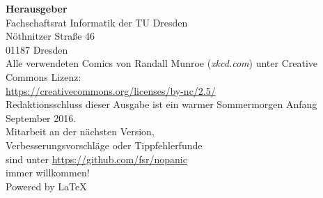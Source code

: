 \newpage
\thispagestyle{empty} %
\color{white}

\begin{minipage}[t][\textheight][b]{.60\textwidth}
\footnotesize
\textbf{Herausgeber} \\
Fachschaftsrat Informatik der TU Dresden\\
Nöthnitzer Straße 46\\
01187 Dresden\\[1\baselineskip]

Alle verwendeten Comics von Randall Munroe (\textit{xkcd.com}) unter Creative Commons Lizenz:\\
\url{https://creativecommons.org/licenses/by-nc/2.5/}\\[1\baselineskip]

Redaktionsschluss dieser Ausgabe ist ein warmer Sommermorgen Anfang September 2016.\\[1\baselineskip]

Mitarbeit an der nächsten Version,\\
Verbesserungsvorschläge oder Tippfehlerfunde\\
sind unter \url{https://github.com/fsr/nopanic}\\
immer willkommen!\\[1\baselineskip]

Powered by \LaTeX
\end{minipage}%
\hspace{.20\textwidth}%
